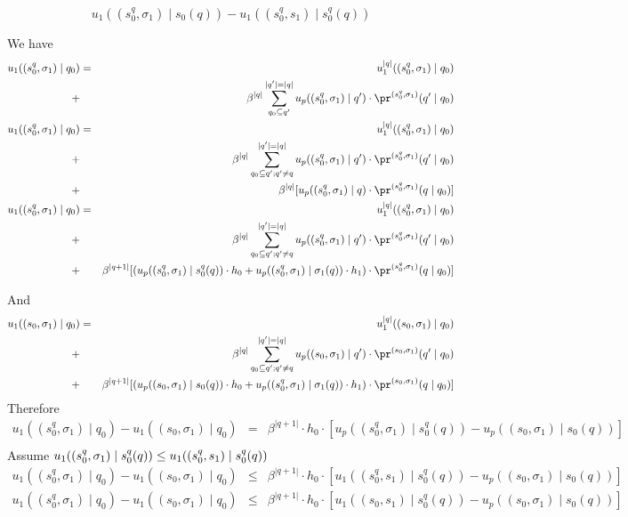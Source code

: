 $$u_1((s_0^q,\sigma_1) \mid s_0(q)) -  u_1((s_0^q,s_1) \mid s_0^q(q))$$


We have
\begin{eqnarray*}
u_1((s^{q}_0,\sigma_1) \mid q_0) &= & u_1^{|q|}((s^q_0,\sigma_1) \mid q_0) \\
+ && \beta^{|q|} \sum_{q_0 \subseteq q'}^{|q'|=|q|} u_p((s^{q}_0,\sigma_1) \mid q') \cdot \pr^{(s^{q}_0,\sigma_1)}(q' \mid q_0) \\
u_1((s^{q}_0,\sigma_1) \mid q_0) &= & u_1^{|q|}((s^q_0,\sigma_1) \mid q_0) \\
+ && \beta^{|q|} \sum_{q_0 \subseteq q' ; q'\neq q}^{|q'|=|q|} u_p((s^{q}_0,\sigma_1) \mid q') \cdot \pr^{(s^{q}_0,\sigma_1)}(q' \mid q_0) \\
+ && \beta^{|q|} [  u_p((s^{q}_0,\sigma_1) \mid q) \cdot \pr^{(s^{q}_0,\sigma_1)}(q \mid q_0) ]\\
u_1((s^{q}_0,\sigma_1) \mid q_0) &= & u_1^{|q|}((s^q_0,\sigma_1) \mid q_0) \\
+ && \beta^{|q|} \sum_{q_0 \subseteq q' ; q'\neq q}^{|q'|=|q|} u_p((s^{q}_0,\sigma_1) \mid q') \cdot \pr^{(s^{q}_0,\sigma_1)}(q' \mid q_0) \\
+ && \beta^{|q+1|}[  (u_p((s^{q}_0,\sigma_1) \mid s^q_0(q))\cdot h_0 + u_p((s^{q}_0,\sigma_1) \mid \sigma_1(q))\cdot h_1  ) \cdot \pr^{(s^{q}_0,\sigma_1)}(q \mid q_0)] \\
\end{eqnarray*}





And 
\begin{eqnarray*}	
u_1((s_0,\sigma_1) \mid q_0) &= & u_1^{|q|}((s_0,\sigma_1) \mid q_0) \\
+ && \beta^{|q|} \sum_{q_0 \subseteq q' ; q'\neq q}^{|q'|=|q|} u_p((s_0,\sigma_1) \mid q') \cdot \pr^{(s_0,\sigma_1)}(q' \mid q_0) \\
+ && \beta^{|q+1|}[  (u_p((s_0,\sigma_1) \mid s_0(q))\cdot h_0 + u_p((s^{q}_0,\sigma_1) \mid \sigma_1(q))\cdot h_1  ) \cdot \pr^{(s_0,\sigma_1)}(q \mid q_0)] \\
\end{eqnarray*}
Therefore
\begin{eqnarray*}	
u_1((s^{q}_0,\sigma_1) \mid q_0)- u_1((s_0,\sigma_1) \mid q_0)  & = & \beta^{|q+1|}\cdot h_0 \cdot [u_p((s^{q}_0,\sigma_1) \mid s^q_0(q)) - u_p((s_0,\sigma_1) \mid s_0(q))] \\
\end{eqnarray*}
Assume $u_1((s_0^q,\sigma_1) \mid s^q_0(q))  \leq  u_1((s_0^q,s_1) \mid s_0^q(q))\\ $
\begin{eqnarray*}	
u_1((s^{q}_0,\sigma_1) \mid q_0)- u_1((s_0,\sigma_1) \mid q_0)  & \leq & \beta^{|q+1|}\cdot h_0 \cdot [u_1((s_0^q,s_1) \mid s_0^q(q)) - u_p((s_0,\sigma_1) \mid s_0(q))] \\
u_1((s^{q}_0,\sigma_1) \mid q_0)- u_1((s_0,\sigma_1) \mid q_0)  & \leq & \beta^{|q+1|}\cdot h_0 \cdot [u_1((s_0,s_1) \mid s_0^q(q)) - u_p((s_0,\sigma_1) \mid s_0(q))] \\
\end{eqnarray*}
\fi